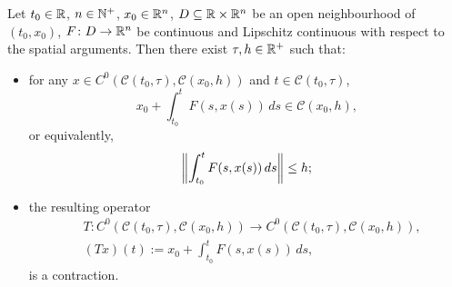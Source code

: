 \begin{proposition}
  \label{proposition:picard_lindelof_preparation}
  Let
    $t_0 \in \mathbb{R}$,
    $n \in \mathbb{N}^+$,
    $x_0 \in \mathbb{R}^n$,
    $D \subseteq \mathbb{R} \times \mathbb{R}^n$ be an open neighbourhood of $(t_0, x_0)$,
    $F \colon D \to \mathbb{R}^n$ be continuous and Lipschitz continuous with respect to
      the spatial arguments.
  Then there exist $\tau, h \in \mathbb{R}^+$ such that:
  \begin{itemize}
    \item
      for any
      $x \in C^0(\mathcal{C}(t_0, \tau), \mathcal{C}(x_0, h))$ and
      $t \in \mathcal{C}(t_0, \tau)$,
      \begin{equation}
        x_0 + \int_{t_0}^t F(s, x(s))\, d s \in \mathcal{C}(x_0, h),
      \end{equation}
      or equivalently,
      \begin{equation}
        \left\lVert\int_{t_0}^t F(s, x(s))\, d s\right\rVert \leq h;
      \end{equation}
    \item
      the resulting operator
      \begin{equation}
        \label{equation:ordinary_differential_equation/initial_value_problem/operator}
        \begin{split}
          & T
            \colon C^0(\mathcal{C}(t_0, \tau), \mathcal{C}(x_0, h))
            \to C^0(\mathcal{C}(t_0, \tau), \mathcal{C}(x_0, h)), \\
          & (T x)(t) := x_0 + \int_{t_0}^t F(s, x(s))\, d s,
        \end{split}
      \end{equation}
      is a contraction.
  \end{itemize}
\end{proposition}
